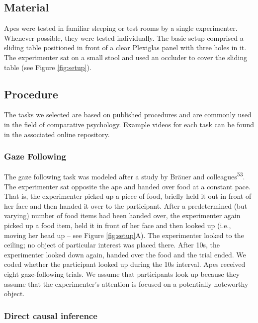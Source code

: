 \documentclass[
  man,floatsintext]{apa6}
\begin{document}
\hypertarget{material}{%
\subsection{Material}\label{material}}

Apes were tested in familiar sleeping or test rooms by a single experimenter. Whenever possible, they were tested individually. The basic setup comprised a sliding table positioned in front of a clear Plexiglas panel with three holes in it. The experimenter sat on a small stool and used an occluder to cover the sliding table (see Figure \ref{fig:setup}).

\hypertarget{procedure}{%
\subsection{Procedure}\label{procedure}}

The tasks we selected are based on published procedures and are commonly used in the field of comparative psychology. Example videos for each task can be found in the associated online repository.

\hypertarget{gaze-following}{%
\subsubsection{Gaze Following}\label{gaze-following}}

The gaze following task was modeled after a study by Bräuer and colleagues\textsuperscript{53}. The experimenter sat opposite the ape and handed over food at a constant pace. That is, the experimenter picked up a piece of food, briefly held it out in front of her face and then handed it over to the participant. After a predetermined (but varying) number of food items had been handed over, the experimenter again picked up a food item, held it in front of her face and then looked up (i.e., moving her head up -- see Figure \ref{fig:setup}A). The experimenter looked to the ceiling; no object of particular interest was placed there. After 10s, the experimenter looked down again, handed over the food and the trial ended. We coded whether the participant looked up during the 10s interval. Apes received eight gaze-following trials. We assume that participants look up because they assume that the experimenter's attention is focused on a potentially noteworthy object.

\hypertarget{direct-causal-inference}{%
\subsubsection{Direct causal inference}\label{direct-causal-inference}}
\end{document}
